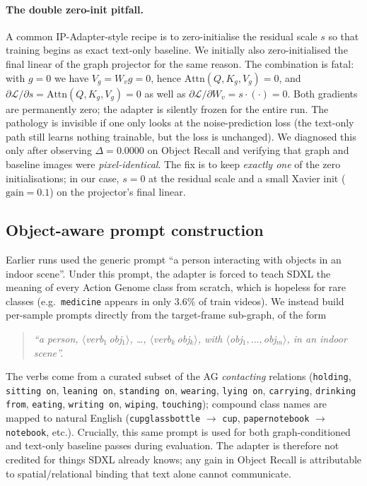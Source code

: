 \documentclass[11pt]{article}
\begin{document}
\paragraph{The double zero-init pitfall.} A common
IP-Adapter-style recipe is to zero-initialise the residual scale $s$ so
that training begins as exact text-only baseline. We initially also
zero-initialised the final linear of the graph projector for the same
reason. The combination is fatal: with $g=0$ we have $V_g=W_v g=0$,
hence $\mathrm{Attn}(Q,K_g,V_g)=0$, and $\partial \mathcal{L}/\partial
s = \mathrm{Attn}(Q,K_g,V_g) = 0$ as well as $\partial
\mathcal{L}/\partial W_v = s\cdot(\cdot) = 0$. Both gradients are
permanently zero; the adapter is silently frozen for the entire run.
The pathology is invisible if one only looks at the noise-prediction
loss (the text-only path still learns nothing trainable, but the loss
is unchanged). We diagnosed this only after observing $\Delta=0.0000$
on Object Recall and verifying that graph and baseline images were
\emph{pixel-identical}. The fix is to keep \emph{exactly one} of the
zero initialisations; in our case, $s=0$ at the residual scale and a
small Xavier init ($\text{gain}=0.1$) on the projector's final linear.

\subsection{Object-aware prompt construction}
\label{ssec:prompt}
Earlier runs used the generic prompt ``a person interacting with
objects in an indoor scene''. Under this prompt, the adapter is
forced to teach SDXL the meaning of every Action Genome class from
scratch, which is hopeless for rare classes (e.g.\ \texttt{medicine}
appears in only $3.6\%$ of train videos). We instead build per-sample
prompts directly from the target-frame sub-graph, of the form
\begin{quote}\itshape
``a person, $\langle$verb$_1\,$obj$_1\rangle$, \dots,
$\langle$verb$_k\,$obj$_k\rangle$, with $\langle$obj$_1,\dots,$obj$_m\rangle$,
in an indoor scene''.
\end{quote}
The verbs come from a curated subset of the AG \emph{contacting}
relations (\texttt{holding}, \texttt{sitting on}, \texttt{leaning on},
\texttt{standing on}, \texttt{wearing}, \texttt{lying on},
\texttt{carrying}, \texttt{drinking from}, \texttt{eating},
\texttt{writing on}, \texttt{wiping}, \texttt{touching}); compound class
names are mapped to natural English (\texttt{cupglassbottle}
$\rightarrow$ \texttt{cup}, \texttt{papernotebook} $\rightarrow$
\texttt{notebook}, etc.). Crucially, this same prompt is used for both
graph-conditioned and text-only baseline passes during evaluation. The
adapter is therefore not credited for things SDXL already knows; any
gain in Object Recall is attributable to spatial/relational binding
that text alone cannot communicate.
\end{document}
